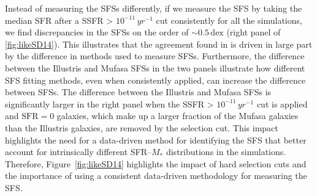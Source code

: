 \documentclass[tighten, preprint]{aastex62}
\begin{document}
Instead of measuring the SFSs differently, if we measure the SFS by taking the
median SFR after a SSFR > $10^{-11}\,yr^{-1}$ cut consistently for all the  
simulations, we find discrepancies in the SFSs on the order of ${\sim}0.5\,\mathrm{dex}$
(right panel of \ref{fig:likeSD14}). This illustrates that the agreement found in 
\cite{somerville2015b} is driven in large part by the difference in methods used to 
measure SFSs.
{\color{red}
Furthermore, the difference between the Illustris and {\sc Mufasa} SFSs in 
the two panels illustrate how different SFS fitting methods, even when 
consistently applied, can increase the difference between SFSs. The difference 
between the Illustris and {\sc Mufasa} SFSs is significantly larger in the 
right panel when the SSFR > $10^{-11}\,yr^{-1}$ cut is applied and 
$\mathrm{SFR}{=}0$ galaxies, which make up a larger fraction of the {\sc Mufasa} 
galaxies than the Illustris galaxies, are removed by the selection cut. 
This impact highlights the need for a data-driven method for identifying the 
SFS that better account for intrinsically different SFR--$M_*$ distributions 
in the simulations. Therefore, Figure~\ref{fig:likeSD14} highlights the impact 
of hard selection cuts and the importance of using a consistent data-driven 
methodology for measuring the SFS. 
}
\end{document}
